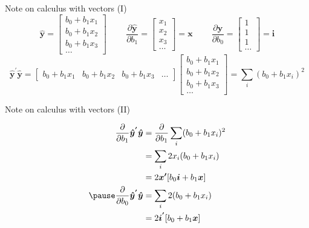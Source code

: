 \documentclass[aspectratio=169, handout]{beamer}
\numberwithin{equation}{section}
\begin{document}
\begin{frame}{Note on calculus with vectors (I)}
$$\bm{\hat{y}}=\begin{bmatrix} b_0+b_1 x_1 \\  b_0+b_1 x_2 \\   b_0+b_1 x_3 \\ \ldots \end{bmatrix}\ \quad \quad \frac{\partial\bm{\hat{y} }}{\partial b_1}=\begin{bmatrix} x_1  \\ x_2 \\ x_3 \\ \ldots \end{bmatrix}=\bm{x}\ \quad \quad \frac{\partial\bm{\hat{y} }}{\partial b_0}=\begin{bmatrix} 1 \\ 1 \\ 1 \\ \ldots \end{bmatrix}=\bm{i}$$\pause
  $$\bm{\hat{y}^{'}}\bm{\hat{y}}=\begin{bmatrix}  b_0+b_1 x_1&  b_0+b_1 x_2 &  b_0+b_1 x_3 & \ldots \end{bmatrix}\begin{bmatrix} b_0+b_1 x_1 \\  b_0+b_1x_2 \\  b_0+b_1 x_3 \\ \ldots \end{bmatrix}= \sum_i (b_0+b_1x_i)^2$$
\end{frame}


\begin{frame}{Note on calculus with vectors (II)}

\begin{align*}
\frac{\partial}{\partial b_1}\bm{\hat{y}^{'}}\bm{\hat{y}}&=\frac{\partial}{\partial b_1} \sum_i (b_0+b_1x_i)^2 \\
&=\sum_i 2 x_i (b_0+b_1x_i)\\ 
&=2\bm{x'} [b_0\bm{i}+b_1\bm{x}]\\\pause
\frac{\partial}{\partial b_0}\bm{\hat{y}^{'}}\bm{\hat{y}}&= \sum_i 2(b_0+b_1x_i)\\
&=2  \bm{i^{'}}[b_0+b_1\bm{x}]
\end{align*}
\end{frame}
\end{document}
